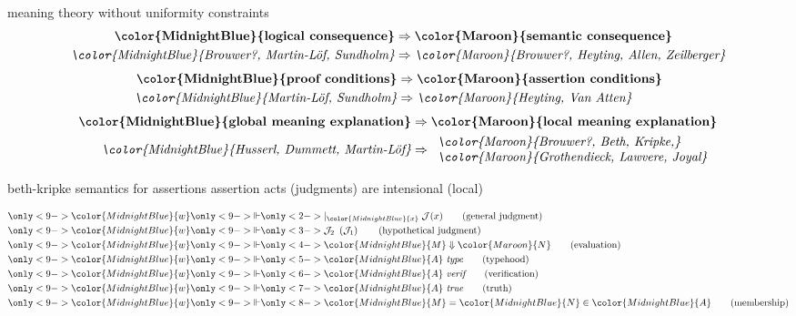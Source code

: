 \documentclass[10pt]{beamer}
\def\InputModeColorName{MidnightBlue}
\def\OutputModeColorName{Maroon}
\newcommand\IMode[1]{{\color{\InputModeColorName}{#1}}}
\newcommand\OMode[1]{{\color{\OutputModeColorName}{#1}}}
\newcommand\GenJ[2]{%
  \vert_{\IMode{#1}}\; #2
}
\newcommand\HypJ[2]{%
  #1\ \left(#2\right)
}
\newcommand\Eval[2]{\IMode{#1}\Downarrow\OMode{#2}}
\newcommand\EqMember[3]{\IMode{#1}=\IMode{#2}\in\IMode{#3}}
\newcommand\IsType[1]{\IMode{#1}\ \text{\rmfamily\itshape type}}
\newcommand\IsTrue[1]{\IMode{#1}\ \text{\rmfamily\itshape true}}
\newcommand\IsVer[1]{\IMode{#1}\ \text{\rmfamily\itshape verif}}
\begin{document}
\begin{frame}{meaning theory without uniformity constraints}
  \pause
  \begin{align*}
    \textbf{\IMode{logical consequence}} &\Rightarrow \textbf{\OMode{semantic consequence}}\\
    \textit{\IMode{Brouwer?, Martin-L\"of, Sundholm}} &\Rightarrow \textit{\OMode{Brouwer?, Heyting, Allen, Zeilberger}}
  \end{align*}
  \pause
  \begin{align*}
    \textbf{\IMode{proof conditions}} &\Rightarrow \textbf{\OMode{assertion conditions}}\\
    \textit{\IMode{Martin-L\"of, Sundholm}} &\Rightarrow \textit{\OMode{Heyting, Van Atten}}
  \end{align*}
  \pause
  \begin{align*}
    \textbf{\IMode{global meaning explanation}} &\Rightarrow \textbf{\OMode{local meaning explanation}}\\
    \textit{\IMode{Husserl, Dummett, Martin-L\"of}} &\Rightarrow
      \begin{array}{l}
        \textit{\OMode{Brouwer?, Beth, Kripke,}}\\
        \textit{\OMode{Grothendieck, Lawvere, Joyal}}
      \end{array}
  \end{align*}
\end{frame}

\begin{frame}{beth-kripke semantics for assertions}
  assertion acts (judgments) are intensional (local)
  \pause

  \begin{align*}
    \only<9->{\IMode{w}}&\only<9->{\Vdash}\only<2->{\GenJ{x}{\mathcal{J}(x)}\tag{general judgment}}\\
    \only<9->{\IMode{w}}&\only<9->{\Vdash}\only<3->{\HypJ{\mathcal{J}_2}{\mathcal{J}_1}\tag{hypothetical judgment}}\\
    \only<9->{\IMode{w}}&\only<9->{\Vdash}\only<4->{\Eval{M}{N}\tag{evaluation}}\\
    \only<9->{\IMode{w}}&\only<9->{\Vdash}\only<5->{\IsType{A}\tag{typehood}}\\
    \only<9->{\IMode{w}}&\only<9->{\Vdash}\only<6->{\IsVer{A}\tag{verification}}\\
    \only<9->{\IMode{w}}&\only<9->{\Vdash}\only<7->{\IsTrue{A}\tag{truth}}\\
    \only<9->{\IMode{w}}&\only<9->{\Vdash}\only<8->{\EqMember{M}{N}{A}\tag{membership}}
  \end{align*}
\end{frame}
\end{document}
